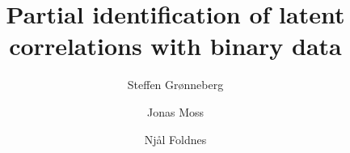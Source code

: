 \documentclass{standalone}
\begin{document}
\author
{
    Steffen Grønneberg \and
    Jonas Moss \and
    Njål Foldnes
}
\title{Partial identification of latent correlations with binary data}
\maketitle

\end{document}
